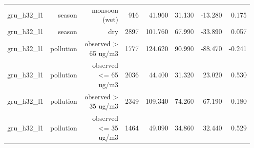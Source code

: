 \begin{table}[htbp]
\begin{tabular}{lrrrrrrr}
gru\_h32\_l1 & season & monsoon (wet) & 916 & 41.960 & 31.130 & -13.280 & 0.175 \\
gru\_h32\_l1 & season & dry & 2897 & 101.760 & 67.990 & -33.890 & 0.057 \\
gru\_h32\_l1 & pollution & observed > 65 ug/m3 & 1777 & 124.620 & 90.990 & -88.470 & -0.241 \\
gru\_h32\_l1 & pollution & observed <= 65 ug/m3 & 2036 & 44.400 & 31.320 & 23.020 & 0.530 \\
gru\_h32\_l1 & pollution & observed > 35 ug/m3 & 2349 & 109.340 & 74.260 & -67.190 & -0.180 \\
gru\_h32\_l1 & pollution & observed <= 35 ug/m3 & 1464 & 49.090 & 34.860 & 32.440 & 0.529 \\
\bottomrule
\end{tabular}
\end{table}
